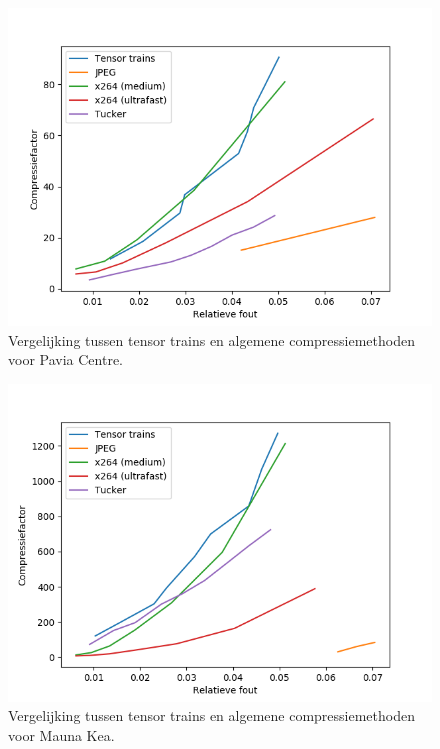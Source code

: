 \begin{figure}[H]
  \centering
  \includegraphics[scale=0.7]{images/general_comparison_new_Pavia_Centre.png}
  \caption{Vergelijking tussen tensor trains en algemene compressiemethoden voor Pavia Centre.}
\label{fig:general-comparison-pavia-centre}
\end{figure}

\begin{figure}[H]
  \centering
  \includegraphics[scale=0.7]{images/general_comparison_new_Mauna_Kea.png}
  \caption{Vergelijking tussen tensor trains en algemene compressiemethoden voor Mauna Kea.}
\label{fig:general-comparison-mauna-kea}
\end{figure}

